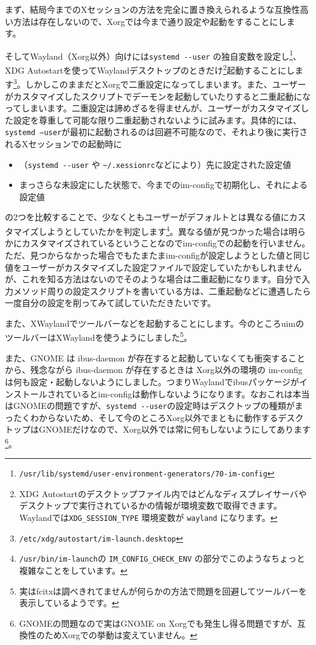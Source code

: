 \documentclass[mingoth,a4paper]{jsarticle}
\begin{document}
まず、結局今までのXセッションの方法を完全に置き換えられるような互換性高い方法は存在しないので、Xorgでは今まで通り設定や起動をすることにします。

そしてWayland（Xorg以外）向けには\verb|systemd --user| の独自変数を設定し\footnote{\texttt{/usr/lib/systemd/user-environment-generators/70-im-config}}、XDG Autostartを使ってWaylandデスクトップのときだけ\footnote{XDG Autostartのデスクトップファイル内ではどんなディスプレイサーバやデスクトップで実行されているかの情報が環境変数で取得できます。Waylandでは\texttt{XDG\_SESSION\_TYPE} 環境変数が \texttt{wayland} になります。}起動することにします\footnote{\texttt{/etc/xdg/autostart/im-launch.desktop}}。しかしこのままだとXorgで二重設定になってしまいます。また、ユーザーがカスタマイズしたスクリプトでデーモンを起動していたりすると二重起動になってしまいます。二重設定は諦めざるを得ませんが、ユーザーがカスタマイズした設定を尊重して可能な限り二重起動されないように試みます。具体的には、\texttt{systemd --user}が最初に起動されるのは回避不可能なので、それより後に実行されるXセッションでの起動時に
\begin{itemize}
 \item （\verb|systemd --user| や \verb|~/.xessionrc|などにより）先に設定された設定値
 \item まっさらな未設定にした状態で、今までのim-configで初期化し、それによる設定値
\end{itemize}
の2つを比較することで、少なくともユーザーがデフォルトとは異なる値にカスタマイズしようとしていたかを判定します\footnote{\texttt{/usr/bin/im-launch}の \texttt{IM\_CONFIG\_CHECK\_ENV} の部分でこのようなちょっと複雑なことをしています。}。異なる値が見つかった場合は明らかにカスタマイズされているということなのでim-configでの起動を行いません。ただ、見つからなかった場合でもたまたまim-configが設定しようとした値と同じ値をユーザーがカスタマイズした設定ファイルで設定していたかもしれませんが、これを知る方法はないのでそのような場合は二重起動になります。自分で入力メソッド周りの設定スクリプトを書いている方は、二重起動などに遭遇したら一度自分の設定を削ってみて試していただきたいです。

また、XWaylandでツールバーなどを起動することにします。今のところuimのツールバーはXWaylandを使うようにしました\footnote{実はfcitxは調べきれてませんが何らかの方法で問題を回避してツールバーを表示しているようです。}。

また、GNOME は ibus-daemon が存在すると起動していなくても衝突することから、残念ながら ibus-daemon が存在するときは Xorg以外の環境の im-config は何も設定・起動しないようにしました。つまりWaylandでibusパッケージがインストールされているとim-configは動作しないようになります。なおこれは本当はGNOMEの問題ですが、\verb|systemd --user|の設定時はデスクトップの種類がまったくわからないため、そして今のところXorg以外でまともに動作するデスクトップはGNOMEだけなので、Xorg以外では常に何もしないようにしてあります\footnote{GNOMEの問題なので実はGNOME on Xorgでも発生し得る問題ですが、互換性のためXorgでの挙動は変えていません。}。
\end{document}
